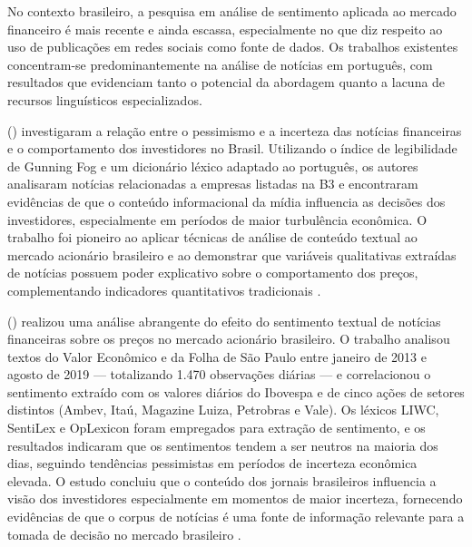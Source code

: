 No contexto brasileiro, a pesquisa em análise de sentimento aplicada ao mercado financeiro é mais recente e ainda escassa, especialmente no que diz respeito ao uso de publicações em redes sociais como fonte de dados. Os trabalhos existentes concentram-se predominantemente na análise de notícias em português, com resultados que evidenciam tanto o potencial da abordagem quanto a lacuna de recursos linguísticos especializados.

\citeauthor{galdi2018} (\citeyear{galdi2018}) investigaram a relação entre o pessimismo e a incerteza das notícias financeiras e o comportamento dos investidores no Brasil. Utilizando o índice de legibilidade de Gunning Fog e um dicionário léxico adaptado ao português, os autores analisaram notícias relacionadas a empresas listadas na B3 e encontraram evidências de que o conteúdo informacional da mídia influencia as decisões dos investidores, especialmente em períodos de maior turbulência econômica. O trabalho foi pioneiro ao aplicar técnicas de análise de conteúdo textual ao mercado acionário brasileiro e ao demonstrar que variáveis qualitativas extraídas de notícias possuem poder explicativo sobre o comportamento dos preços, complementando indicadores quantitativos tradicionais \cite{galdi2018}.

\citeauthor{falcao2020} (\citeyear{falcao2020}) realizou uma análise abrangente do efeito do sentimento textual de notícias financeiras sobre os preços no mercado acionário brasileiro. O trabalho analisou textos do Valor Econômico e da Folha de São Paulo entre janeiro de 2013 e agosto de 2019 --- totalizando 1.470 observações diárias --- e correlacionou o sentimento extraído com os valores diários do Ibovespa e de cinco ações de setores distintos (Ambev, Itaú, Magazine Luiza, Petrobras e Vale). Os léxicos LIWC, SentiLex e OpLexicon foram empregados para extração de sentimento, e os resultados indicaram que os sentimentos tendem a ser neutros na maioria dos dias, seguindo tendências pessimistas em períodos de incerteza econômica elevada. O estudo concluiu que o conteúdo dos jornais brasileiros influencia a visão dos investidores especialmente em momentos de maior incerteza, fornecendo evidências de que o corpus de notícias é uma fonte de informação relevante para a tomada de decisão no mercado brasileiro \cite{falcao2020}.

